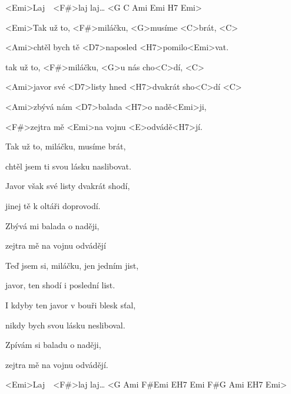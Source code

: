 

<Emi>Laj\ \ <F#\dim>laj laj… <G C Ami Emi H7 Emi> 

\zs
<Emi>Tak už to, <F#\dim>miláčku, <G>musíme <C>brát, <C>

<Ami>chtěl bych tě <D7>naposled <H7>pomilo<Emi>vat.

tak už to, <F#\dim>miláčku, <G>u nás cho<C>dí, <C>

<Ami>javor své <D7>listy hned <H7>dvakrát sho<C>dí <C>

<Ami>zbývá nám <D7>balada <H7>o nadě<Emi>ji,

<F#\dim>zejtra mě <Emi>na vojnu <E\dim>odvádě<H7>jí. 
\ks

\zs
Tak už to, miláčku, musíme brát,

chtěl jsem ti svou lásku naslibovat.

Javor však své listy dvakrát shodí,

jinej tě k oltáři doprovodí.

Zbývá mi balada o naději,

zejtra mě na vojnu odvádějí 
\ks

\zs
Teď jsem si, miláčku, jen jedním jist,

javor, ten shodí i poslední list.

I kdyby ten javor v bouři blesk sťal,

nikdy bych svou lásku nesliboval.

Zpívám si baladu o naději,

zejtra mě na vojnu odvádějí.
\ks

<Emi>Laj\ \ <F#\dim>laj laj… <G Ami F#\dim Emi E\dim H7 Emi F#\dim G Ami E\dim H7 Emi> 

\kp
